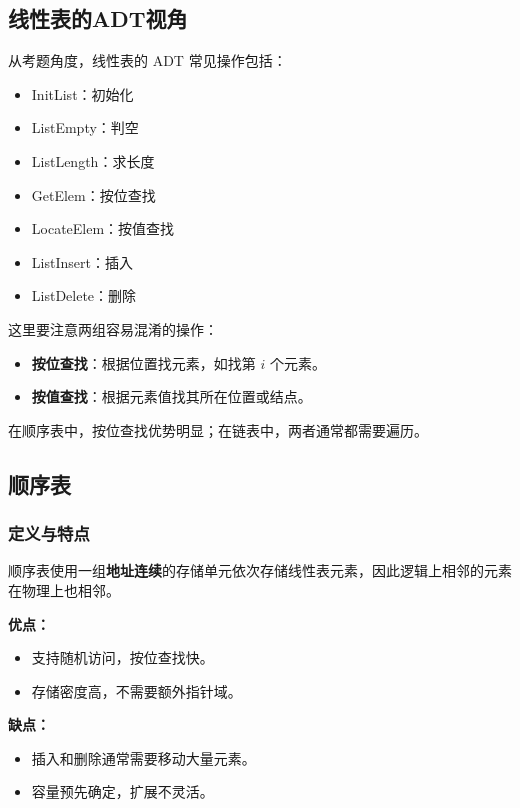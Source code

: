 \documentclass{../../note}
\begin{document}
\subsection{线性表的ADT视角}

从考题角度，线性表的 ADT 常见操作包括：

\begin{itemize}
  \item InitList：初始化
  \item ListEmpty：判空
  \item ListLength：求长度
  \item GetElem：按位查找
  \item LocateElem：按值查找
  \item ListInsert：插入
  \item ListDelete：删除
\end{itemize}

这里要注意两组容易混淆的操作：

\begin{itemize}
  \item \textbf{按位查找}：根据位置找元素，如找第 $i$ 个元素。
  \item \textbf{按值查找}：根据元素值找其所在位置或结点。
\end{itemize}

在顺序表中，按位查找优势明显；在链表中，两者通常都需要遍历。

\subsection{顺序表}

\subsubsection{定义与特点}

顺序表使用一组\textbf{地址连续}的存储单元依次存储线性表元素，因此逻辑上相邻的元素在物理上也相邻。

\textbf{优点：}
\begin{itemize}
  \item 支持随机访问，按位查找快。
  \item 存储密度高，不需要额外指针域。
\end{itemize}

\textbf{缺点：}
\begin{itemize}
  \item 插入和删除通常需要移动大量元素。
  \item 容量预先确定，扩展不灵活。
\end{itemize}
\end{document}
